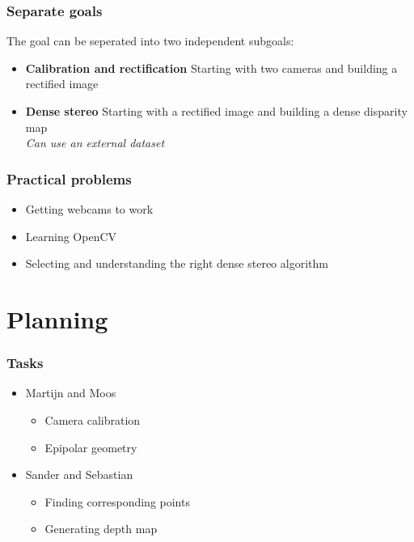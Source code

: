 \documentclass{article}
\begin{document}
  \frametitle{Separate goals}
  The goal can be seperated into two independent subgoals:

  \begin{itemize}
   \item \textbf{Calibration and rectification} Starting with two cameras and building a rectified image
   \item \textbf{Dense stereo} Starting with a rectified image and building a dense disparity map \\ \textit{Can use an external dataset}
  \end{itemize}

  \frametitle{Practical problems}
  \begin{itemize}
   \item Getting webcams to work
   \item Learning OpenCV
   \item Selecting and understanding the right dense stereo algorithm
  \end{itemize}


\section{Planning}


  \frametitle{Tasks}
  \begin{itemize}
    \item Martijn and Moos
    \begin{itemize}
      \item Camera calibration
      \item Epipolar geometry
    \end{itemize}
    \item Sander and Sebastian
    \begin{itemize}
      \item Finding corresponding points
      \item Generating depth map
    \end{itemize}
  \end{itemize}
\end{document}
